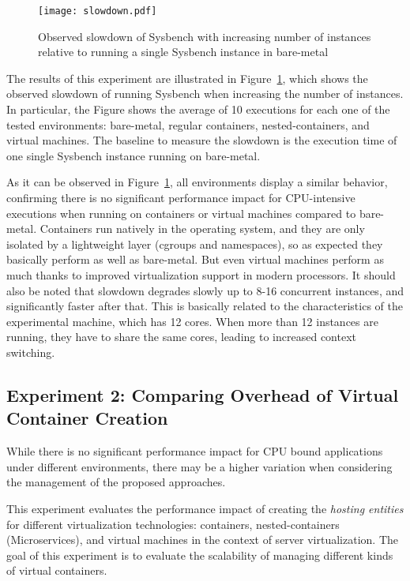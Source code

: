 \documentclass[conference]{IEEEtran}
\begin{document}
\begin{figure}[bth!]
    \center
    \texttt{[image: slowdown.pdf]}
    \caption{Observed slowdown of Sysbench with increasing number of instances
    relative to running a single Sysbench instance in bare-metal}
    \label{fig:slowdown}
\end{figure}

The results of this experiment are illustrated in Figure~\ref{fig:slowdown},
which shows the observed slowdown of running Sysbench when increasing the
number of instances. In particular, the Figure shows the average of 10
executions for each one of the tested environments: bare-metal, regular
containers, nested-containers, and virtual machines. The baseline to measure
the slowdown is the execution time of one single Sysbench instance running on
bare-metal.

As it can be observed in Figure~\ref{fig:slowdown}, all environments display a
similar behavior, confirming there is no significant performance impact for
CPU-intensive executions when running on containers or virtual machines
compared to bare-metal. Containers run natively in the operating system, and
they are only isolated by a lightweight layer (cgroups and namespaces), so as
expected they basically perform as well as bare-metal.  But even virtual
machines perform as much thanks to improved virtualization support in modern
processors.  It should also be noted that slowdown degrades slowly up to 8-16
concurrent instances, and significantly faster after that. This is basically
related to the characteristics of the experimental machine, which has 12
cores.  When more than 12 instances are running, they have to share the same
cores, leading to increased context switching.

\subsection{Experiment 2: Comparing Overhead of Virtual Container Creation}
\label{sub:exp2}

While there is no significant performance impact for CPU bound applications
under different environments, there may be a higher variation when considering
the management of the proposed approaches.

This experiment evaluates the performance impact of creating the
\textit{hosting entities} for different virtualization technologies:
containers, nested-containers (Microservices), and virtual machines in the
context of server virtualization. The goal of this experiment is to evaluate
the scalability of managing different kinds of virtual containers.
\end{document}
